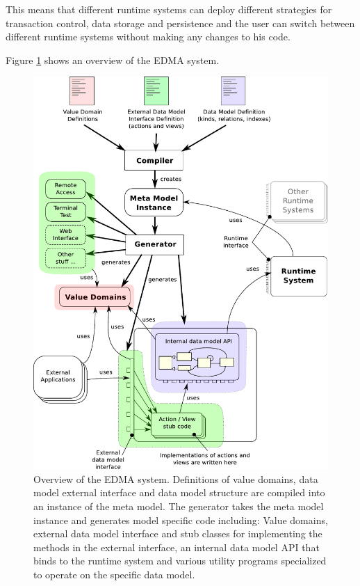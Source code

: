 This means that different runtime systems can deploy different strategies
for transaction control, data storage and persistence and the user
can switch between different runtime systems without making any changes
to his code.

Figure \ref{fig:tobiasBilledeAfEdma} shows an overview of the EDMA
system.

\clearpage
\begin{figure}[h!]
\hspace{-1.5cm}
\includegraphics[width=\textwidth]{img/tobiasBilledeAfEdma.pdf}
\caption{Overview of the EDMA system. Definitions of value domains, data model external interface and data model structure are compiled into an instance of the meta model. The generator takes the meta model instance and generates model specific code including: Value domains, external data model interface and stub classes for implementing the methods in the external interface, an internal data model API that binds to the runtime system and various utility programs specialized to operate on the specific data model.}
\label{fig:tobiasBilledeAfEdma}
\end{figure}
\clearpage


